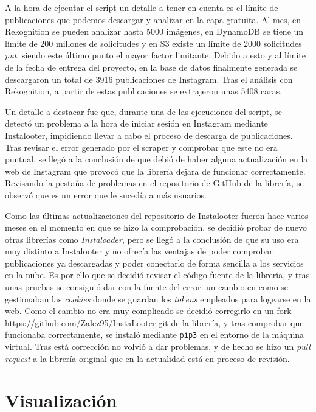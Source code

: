 A la hora de ejecutar el script un detalle a tener en cuenta es el límite de publicaciones que podemos descargar y analizar en la capa gratuita. Al mes, en Rekognition se pueden analizar hasta 5000 imágenes, en DynamoDB se tiene un límite de 200 millones de solicitudes y en S3 existe un límite de 2000 solicitudes \textit{put}, siendo este último punto el mayor factor limitante. Debido a esto y al límite de la fecha de entrega del proyecto, en la base de datos finalmente generada se descargaron un total de 3916 publicaciones de Instagram. Tras el análisis con Rekognition, a partir de estas publicaciones se extrajeron unas 5408 caras.

Un detalle a destacar fue que, durante una de las ejecuciones del script, se detectó un problema a la hora de iniciar sesión en Instagram mediante Instalooter, impidiendo llevar a cabo el proceso de descarga de publicaciones. Tras revisar el error generado por el scraper y comprobar que este no era puntual, se llegó a la conclusión de que debió de haber alguna actualización en la web de Instagram que provocó que la librería dejara de funcionar correctamente. Revisando la pestaña de problemas en el repositorio de GitHub de la librería, se observó que es un error que le sucedía a más usuarios.

Como las últimas actualizaciones del repositorio de Instalooter fueron hace varios meses en el momento en que se hizo la comprobación, se decidió probar de nuevo otras librerías como \textit{Instaloader}, pero se llegó a la conclusión de que su uso era muy distinto a Instalooter y no ofrecía las ventajas de poder comprobar publicaciones ya descargadas y poder conectarlo de forma sencilla a los servicios en la nube. Es por ello que se decidió revisar el código fuente de la librería, y tras unas pruebas se consiguió dar con la fuente del error: un cambio en como se gestionaban las \textit{cookies} donde se guardan los \textit{tokens} empleados para logearse en la web. Como el cambio no era muy complicado se decidió corregirlo en un fork \url{https://github.com/Zalez95/InstaLooter.git} de la librería, y tras comprobar que funcionaba correctamente, se instaló mediante \texttt{pip3} en el entorno de la máquina virtual. Tras está corrección no volvió a dar problemas, y de hecho se hizo un \textit{pull request} a la librería original que en la actualidad está en proceso de revisión.

\section{Visualización}

